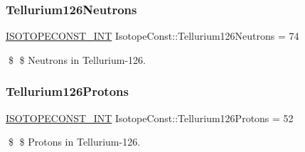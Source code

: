 \subsubsection{\texorpdfstring{Tellurium126\+Neutrons}{Tellurium126Neutrons}}
{\footnotesize\ttfamily \mbox{\hyperlink{group___isotope_const-_macros_ga5f18360b3e99483a35c32d789e62621c}{I\+S\+O\+T\+O\+P\+E\+C\+O\+N\+S\+T\+\_\+\+I\+NT}} Isotope\+Const\+::\+Tellurium126\+Neutrons = 74}

\$ \$ Neutrons in Tellurium-\/126. \mbox{\label{group___isotope_const-_tellurium-_te126_gab6f965e4f96cc9336cd9b12cab560a0f}} 
\subsubsection{\texorpdfstring{Tellurium126\+Protons}{Tellurium126Protons}}
{\footnotesize\ttfamily \mbox{\hyperlink{group___isotope_const-_macros_ga5f18360b3e99483a35c32d789e62621c}{I\+S\+O\+T\+O\+P\+E\+C\+O\+N\+S\+T\+\_\+\+I\+NT}} Isotope\+Const\+::\+Tellurium126\+Protons = 52}

\$ \$ Protons in Tellurium-\/126. 